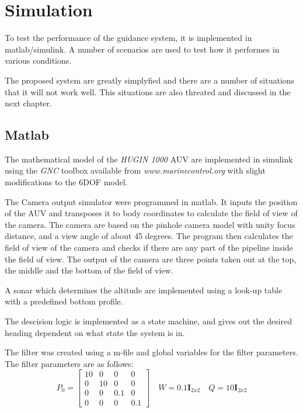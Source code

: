 \chapter{Simulation}
	To test the performance of the guidance system, it is implemented in matlab/simulink. A number of
	scenarios are used to test how it performes in various conditions.

	The proposed system are greatly simplyfied and there are a number of situations that it will not work
	well. This situations are also threated and discussed in the next chapter. 
	

\section{Matlab}
	The mathematical model of the \textit{HUGIN 1000} AUV are implemented in simulink using the
	\textit{GNC} toolbox available from \textit{www.marinecontrol.org} with slight modifications to the
	6DOF model.

	The Camera output simulator were programmed in matlab. It inputs the position of the AUV and
	transposes it to body coordinates to calculate the field of view of the camera. The camera are based
	on the pinhole camera model with unity focus distance, and a view angle of about 45 degrees. The
	program then calculates the field of view of the camera and checks if there are any part of the
	pipeline inside the field of view. The output of the camera are three points taken out at the top, the
	middle and the bottom of the field of view.

	A sonar which determines the altitude are implemented using a look-up table with a predefined bottom
	profile.

	The descision logic is implemented as a state machine, and gives out the desired heading dependent on
	what state the system is in.

	The filter was created using a m-file and global variables for the filter parameters. The filter
	parameters are as follows:
	\begin{equation}
		P_0 = \left [ \begin{matrix}
				10 & 0 & 0 & 0 \\
				0 & 10 & 0 & 0 \\
				0 & 0 & 0.1 & 0 \\
				0 & 0 & 0 & 0.1
				\end{matrix} \right] \quad
		W = 0.1 \mathbf{I}_{2x2} \quad Q = 10 \mathbf{I}_{2x2} 
	\end{equation}

